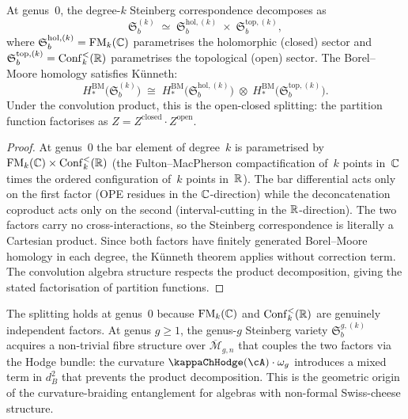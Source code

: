 \begin{proposition}
\label{prop:steinberg-product-decomposition}
At genus~$0$, the degree-$k$ Steinberg correspondence decomposes as
\[
\mathfrak{S}_b^{(k)}
\;\simeq\;
\mathfrak{S}_b^{\mathrm{hol},(k)}
\;\times\;
\mathfrak{S}_b^{\mathrm{top},(k)},
\]
where $\mathfrak{S}_b^{\mathrm{hol},(k)} = \mathrm{FM}_k(\mathbb C)$
parametrises the holomorphic (closed) sector and
$\mathfrak{S}_b^{\mathrm{top},(k)} = \mathrm{Conf}_k^{<}(\mathbb R)$
parametrises the topological (open) sector.
The Borel--Moore homology satisfies K\"unneth:
\begin{equation}
\label{eq:steinberg-kunneth}
H_*^{\mathrm{BM}}\!\bigl(\mathfrak{S}_b^{(k)}\bigr)
\;\cong\;
H_*^{\mathrm{BM}}\!\bigl(\mathfrak{S}_b^{\mathrm{hol},(k)}\bigr)
\;\otimes\;
H_*^{\mathrm{BM}}\!\bigl(\mathfrak{S}_b^{\mathrm{top},(k)}\bigr).
\end{equation}
Under the convolution product, this is the open-closed splitting:
the partition function factorises as
$Z = Z^{\mathrm{closed}} \cdot Z^{\mathrm{open}}$.
\end{proposition}

\begin{proof}
At genus~$0$ the bar element of degree~$k$ is parametrised by
$\mathrm{FM}_k(\mathbb C) \times \mathrm{Conf}_k^{<}(\mathbb R)$
(the Fulton--MacPherson compactification of~$k$ points in~$\mathbb C$
times the ordered configuration of~$k$ points in~$\mathbb R$).
The bar differential acts only on the first factor
(OPE residues in the $\mathbb C$-direction) while the deconcatenation coproduct
acts only on the second (interval-cutting in the $\mathbb R$-direction).
The two factors carry no cross-interactions, so the
Steinberg correspondence is literally a Cartesian product.
Since both factors have finitely generated Borel--Moore homology
in each degree, the K\"unneth theorem applies without correction term.
The convolution algebra structure respects the product decomposition,
giving the stated factorisation of partition functions.
\end{proof}

\begin{remark}
\label{rem:kunneth-genus-obstruction}
The splitting holds at genus~$0$ because
$\mathrm{FM}_k(\mathbb C)$ and $\mathrm{Conf}_k^{<}(\mathbb R)$
are genuinely independent factors.
At genus $g \geq 1$, the genus-$g$ Steinberg variety
$\mathfrak{S}_b^{g,(k)}$ acquires a non-trivial fibre structure
over $\overline{\mathcal{M}}_{g,n}$ that couples the two factors
via the Hodge bundle: the curvature $\kappaChHodge(\cA)\cdot\omega_g$
introduces a mixed term in $d_B^2$ that prevents the product
decomposition.
This is the geometric origin of the curvature-braiding entanglement
for algebras with non-formal Swiss-cheese structure.
\end{remark}

